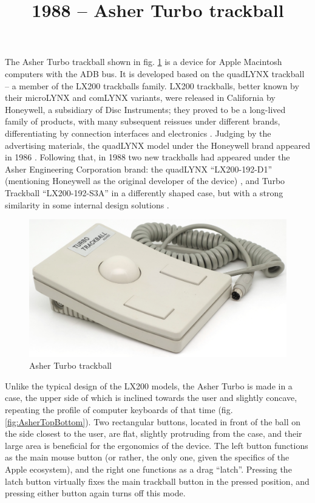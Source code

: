 \documentclass[11pt, a4paper]{article}
\begin{document}
\title{1988 -- Asher Turbo trackball}
\date{}
\maketitle
{}
The Asher Turbo trackball shown in fig. \ref{fig:AsherPic} is a device for Apple Macintosh computers with the ADB bus. It is developed based on the quadLYNX trackball -- a member of the LX200 trackballs family. LX200 trackballs, better known by their microLYNX and comLYNX variants, were released in California by Honeywell, a subsidiary of Disc Instruments; they proved to be a long-lived family of products, with many subsequent reissues under different brands, differentiating by connection interfaces and electronics \cite{lx200}. Judging by the advertising materials, the quadLYNX model under the Honeywell brand appeared in 1986 \cite{honeywell}. Following that, in 1988 two new trackballs had appeared under the Asher Engineering Corporation brand: the quadLYNX ``LX200-192-D1'' (mentioning Honeywell as the original developer of the device) \cite{asher}, and Turbo Trackball ``LX200-192-S3A'' in a differently shaped case, but with a strong similarity in some internal design solutions \cite{turbo}.

\begin{figure}[h]
    \centering
    \includegraphics[width=\textwidth]{1988_asher_turbo_trackball/pic_60.jpg}
    \caption{Asher Turbo trackball}
    \label{fig:AsherPic}
\end{figure}

Unlike the typical design of the LX200 models, the Asher Turbo is made in a case, the upper side of which is inclined towards the user and slightly concave, repeating the profile of computer keyboards of that time (fig. \ref{fig:AsherTopBottom}). Two rectangular buttons, located in front of the ball on the side closest to the user, are flat, slightly protruding from the case, and their large area is beneficial for the ergonomics of the device. The left button functions as the main mouse button (or rather, the only one, given the specifics of the Apple ecosystem), and the right one functions as a drag ``latch''. Pressing the latch button virtually fixes the main trackball button in the pressed position, and pressing either button again turns off this mode.
\end{document}
